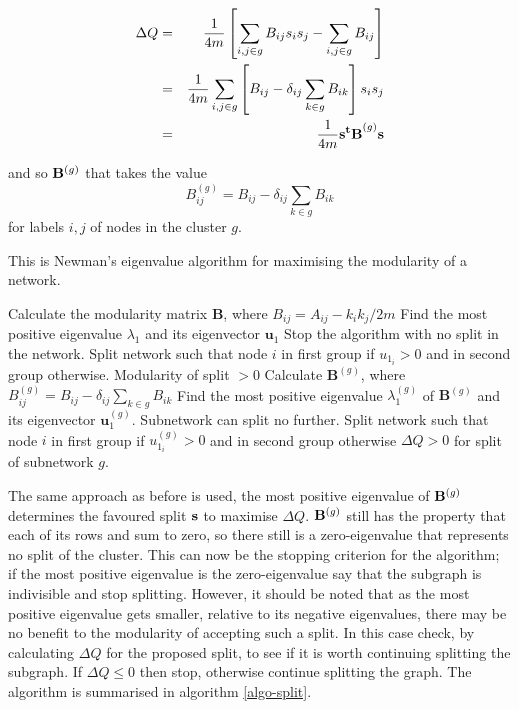 \begin{samepage}
\begin{eqnarray}
\Delta Q & = & \frac{1}{4m}\left[ \sum_{i,j \in g} B_{ij}s_is_j - \sum_{i,j \in g}B_{ij}\right] \cr
& = & \frac{1}{4m}\sum_{i,j \in g}\left[ B_{ij} - \delta_{ij}\sum_{k \in g} B_{ik}\right]s_is_j \cr
& = & \frac{1}{4m}{\bf s^tB}^{(g)}{\bf s}
\end{eqnarray}
\end{samepage}
and so ${\bf B}^{(g)}$ that takes the value
\begin{equation}
B^{(g)}_{ij} = B_{ij} - \delta_{ij}\sum_{k \in g} B_{ik}
\end{equation}
for labels $i,j$ of nodes in the cluster $g$.

\begin{algorithm}
\caption{This is Newman's eigenvalue algorithm for maximising the modularity of a network.}
\label{algo-split}
\begin{algorithmic}
\STATE Calculate the modularity matrix $\mathbf{B}$, where $B_{ij} = A_{ij} - k_ik_j/2m$
\STATE Find the most positive eigenvalue $\lambda_1$ and its eigenvector $\mathbf{u}_1$
\STATE Stop the algorithm with no split in the network.
\ELSE
\STATE Split network such that node $i$ in first group if $u_{1_{i}} > 0$ and in second group otherwise.
\ENSURE Modularity of split $> 0$
\ENDIF
{}
\STATE Calculate $\mathbf{B}^{(g)}$, where $B^{(g)}_{ij} = B_{ij} - \delta_{ij}\sum_{k\in g}B_{ik}$
\STATE Find the most positive eigenvalue $\lambda^{(g)}_1$ of $\mathbf{B}^{(g)}$ and its eigenvector $\mathbf{u}^{(g)}_1$.
\STATE Subnetwork can split no further.
\ELSE
\STATE Split network such that node $i$ in first group if $u^{(g)}_{1_{i}} > 0$ and in second group otherwise
\ENSURE $\Delta Q > 0$ for split of subnetwork $g$.
\ENDIF
\ENDFOR
\end{algorithmic}
\end{algorithm}

The same approach as before is used, the most
positive eigenvalue of ${\bf B}^{(g)}$ determines the favoured split
${\bf s}$ to maximise $\Delta Q$. ${\bf B}^{(g)}$ still has the
property that each of its rows and sum to zero, so there still is a
zero-eigenvalue that represents no split of the cluster.  This can
now be the stopping criterion for the algorithm; if the most positive eigenvalue is the
zero-eigenvalue say that the subgraph is indivisible and stop
splitting.  However, it should be noted that as the most
positive eigenvalue gets smaller, relative to its negative
eigenvalues, there may be no benefit to the modularity of accepting
such a split.  In this case  check, by calculating $\Delta Q$ for
the proposed split, to see if it is worth continuing splitting the subgraph.
If $\Delta Q \leq 0$ then stop, otherwise continue
splitting the graph.  The algorithm is summarised in algorithm \ref{algo-split}.  

